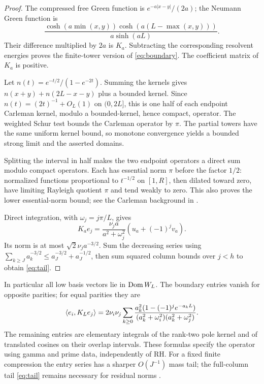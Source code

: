 \begin{proof}
The compressed free Green function is $e^{-a|x-y|}/(2a)$; the Neumann
Green function is
\[
\frac{\cosh(a\min(x,y))\cosh(a(L-\max(x,y)))}{a\sinh(aL)}.
\]
Their difference multiplied by $2a$ is $K_a$. Subtracting the corresponding
resolvent energies proves the finite-tower version of \eqref{eq:boundary}.
The coefficient matrix of $K_a$ is positive.

Let $n(t)=e^{-t/2}/(1-e^{-2t})$. Summing the kernels gives
$n(x+y)+n(2L-x-y)$ plus a bounded kernel. Since
$n(t)=(2t)^{-1}+O_L(1)$ on $(0,2L]$, this is one half of each endpoint
Carleman kernel, modulo a bounded-kernel, hence compact, operator. The
weighted Schur test bounds the Carleman operator by $\pi$. The partial
towers have the same uniform kernel bound, so monotone convergence yields
a bounded strong limit and the asserted domains.

Splitting the interval in half makes the two endpoint operators a direct
sum modulo compact operators. Each has essential norm $\pi$ before the
factor $1/2$: normalized functions proportional to $t^{-1/2}$ on $[1,R]$,
then dilated toward zero, have limiting Rayleigh quotient $\pi$ and tend
weakly to zero. This also proves the lower essential-norm bound; see the
Carleman background in \cite{Yafaev}.

Direct integration, with $\omega_j=j\pi/L$, gives
\begin{equation}\label{eq:column}
K_ae_j=\frac{\nu_j a}{a^2+\omega_j^2}(u_a+(-1)^jv_a).
\end{equation}
Its norm is at most $\sqrt2\nu_j a^{-3/2}$. Sum the decreasing series
using $\sum_{k\ge J}a_k^{-3/2}\le a_J^{-3/2}+a_J^{-1/2}$, then sum squared
column bounds over $j<h$ to obtain \eqref{eq:tail}.
\end{proof}

In particular all low basis vectors lie in $\operatorname{Dom} W_L$. The boundary entries
vanish for opposite parities; for equal parities they are
\begin{equation}\label{eq:entries}
\langle e_i,K_Le_j\rangle=2\nu_i\nu_j\sum_{k\ge0}
\frac{a_k^2(1-(-1)^j e^{-a_kL})}
{(a_k^2+\omega_i^2)(a_k^2+\omega_j^2)}.
\end{equation}
The remaining entries are elementary integrals of the rank-two pole
kernel and of translated cosines on their overlap intervals. These formulas
specify the operator using gamma and prime data, independently of RH.
For a fixed finite compression the entry series has a sharper $O(J^{-1})$
mass tail; the full-column tail \eqref{eq:tail} remains necessary for
residual norms \cite[Section 6]{Companion}.

